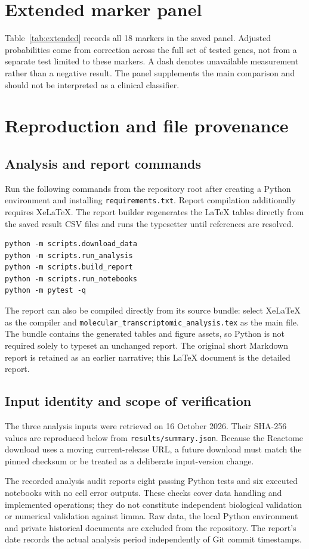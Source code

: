 \documentclass[11pt,a4paper]{article}
\begin{document}
\clearpage
{}

\clearpage
\appendix
\section{Extended marker panel}\label{app:markers}
Table~\ref{tab:extended} records all 18 markers in the saved panel. Adjusted probabilities come from correction across the full set of tested genes, not from a separate test limited to these markers. A dash denotes unavailable measurement rather than a negative result. The panel supplements the main comparison and should not be interpreted as a clinical classifier.


\section{Reproduction and file provenance}
\subsection{Analysis and report commands}
Run the following commands from the repository root after creating a Python environment and installing \texttt{requirements.txt}. Report compilation additionally requires XeLaTeX. The report builder regenerates the LaTeX tables directly from the saved result CSV files and runs the typesetter until references are resolved.
\begin{verbatim}
python -m scripts.download_data
python -m scripts.run_analysis
python -m scripts.build_report
python -m scripts.run_notebooks
python -m pytest -q
\end{verbatim}
The report can also be compiled directly from its source bundle: select XeLaTeX as the compiler and \texttt{molecular\_transcriptomic\_analysis.tex} as the main file. The bundle contains the generated tables and figure assets, so Python is not required solely to typeset an unchanged report. The original short Markdown report is retained as an earlier narrative; this LaTeX document is the detailed report.

\subsection{Input identity and scope of verification}
The three analysis inputs were retrieved on 16 October 2026. Their SHA-256 values are reproduced below from \texttt{results/summary.json}. Because the Reactome download uses a moving current-release URL, a future download must match the pinned checksum or be treated as a deliberate input-version change.


The recorded analysis audit reports eight passing Python tests and six executed notebooks with no cell error outputs. These checks cover data handling and implemented operations; they do not constitute independent biological validation or numerical validation against limma. Raw data, the local Python environment and private historical documents are excluded from the repository. The report's date records the actual analysis period independently of Git commit timestamps.
\end{document}
